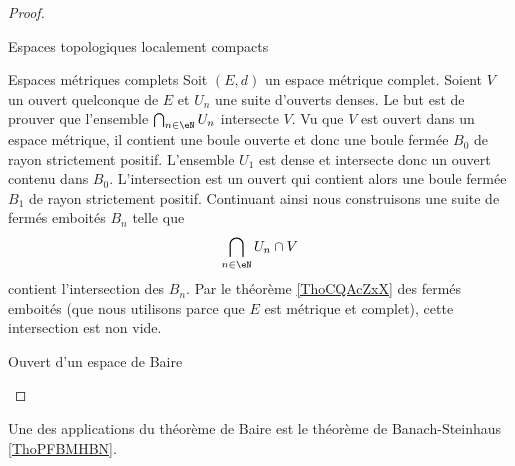 \begin{proof}
    \begin{subproof}
    \item[Espaces topologiques localement compacts]
        \item[Espaces métriques complets]
            Soit \( (E,d)\) un espace métrique complet. Soient \( V\) un ouvert quelconque de \( E\) et \( U_n\) une suite d'ouverts denses. Le but est de prouver que l'ensemble \( \bigcap_{n\in \eN}U_n\) intersecte \( V\). Vu que \( V\) est ouvert dans un espace métrique, il contient une boule ouverte et donc une boule fermée \( B_0\) de rayon strictement positif. L'ensemble \( U_1\) est dense et intersecte donc un ouvert contenu dans \( B_0\). L'intersection est un ouvert qui contient alors une boule fermée \( B_1\) de rayon strictement positif. Continuant ainsi nous construisons une suite de fermés emboités \( B_n\) telle que
            \begin{equation}
                \bigcap_{n\in \eN}U_n\cap V
            \end{equation}
            contient l'intersection des \( B_n\). Par le théorème \ref{ThoCQAcZxX} des fermés emboités (que nous utilisons parce que \( E\) est métrique et complet), cette intersection est non vide.
        \item[Ouvert d'un espace de Baire]
    \end{subproof}
\end{proof}

Une des applications du théorème de Baire est le théorème de Banach-Steinhaus \ref{ThoPFBMHBN}.
